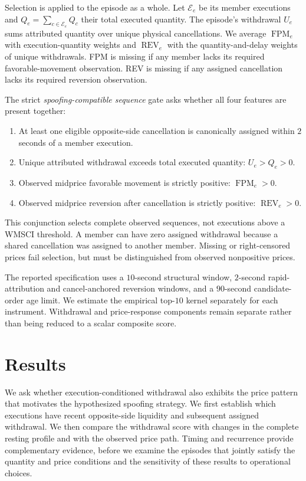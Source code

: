 \documentclass[11pt]{article}
\begin{document}
Selection is applied to the episode as a whole. Let $\mathcal{E}_e$ be its member executions and $Q_e=\sum_{c\in\mathcal{E}_e}Q_c$ their total executed quantity. The episode's withdrawal $U_e$ sums attributed quantity over unique physical cancellations. We average $\operatorname{FPM}_e$ with execution-quantity weights and $\operatorname{REV}_e$ with the quantity-and-delay weights of unique withdrawals. FPM is missing if any member lacks its required favorable-movement observation. REV is missing if any assigned cancellation lacks its required reversion observation.

The strict \textit{spoofing-compatible sequence} gate asks whether all four features are present together:
\begin{enumerate}
    \item At least one eligible opposite-side cancellation is canonically assigned within $2$ seconds of a member execution.
    \item Unique attributed withdrawal exceeds total executed quantity: $U_e>Q_e>0$.
    \item Observed midprice favorable movement is strictly positive: $\operatorname{FPM}_e>0$.
    \item Observed midprice reversion after cancellation is strictly positive: $\operatorname{REV}_e>0$.
\end{enumerate}
This conjunction selects complete observed sequences, not executions above a WMSCI threshold. A member can have zero assigned withdrawal because a shared cancellation was assigned to another member. Missing or right-censored prices fail selection, but must be distinguished from observed nonpositive prices.

The reported specification uses a $10$-second structural window, $2$-second rapid-attribution and cancel-anchored reversion
windows, and a $90$-second candidate-order age limit. We estimate the empirical top-$10$ kernel separately for each
instrument. Withdrawal and price-response components remain separate rather than being reduced to a scalar composite score.

\section{Results}
\label{sec:results}

We ask whether execution-conditioned withdrawal also exhibits the price pattern that motivates the hypothesized spoofing strategy. We first establish which executions have recent opposite-side liquidity and subsequent assigned withdrawal. We then compare the withdrawal score with changes in the complete resting profile and with the observed price path. Timing and recurrence provide complementary evidence, before we examine the episodes that jointly satisfy the quantity and price conditions and the sensitivity of these results to operational choices.
\end{document}
